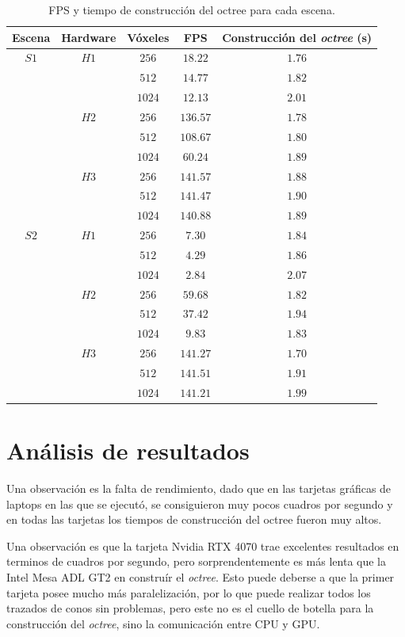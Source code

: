 \begin{table}[ht]
\centering
\begin{tabular}{|c|c|c|c|c|}
	\hline
	\textbf{Escena} & \textbf{Hardware} & \textbf{Vóxeles} & \textbf{FPS} & \textbf{Construcción del \textit{octree} (s)} \\
	\hline
	$S1$ & $H1$ & $256$ & $18.22$ & $1.76$ \\
	\cline{3-5}
	 & & $512$ & $14.77$ & $1.82$ \\
	\cline{3-5}
	 & & $1024$ & $12.13$ & $2.01$ \\
	\cline{2-5}
	 & $H2$ & $256$ & $136.57$ & $1.78$ \\
	\cline{3-5}
	 & & $512$ & $108.67$ & $1.80$ \\
	\cline{3-5}
	 & & $1024$ & $60.24$ & $1.89$ \\
	\cline{2-5}
	 & $H3$ & $256$ & $141.57$ & $1.88$ \\
	\cline{3-5}
	 & & $512$ & $141.47$ & $1.90$ \\
	\cline{3-5}
	 & & $1024$ & $140.88$ & $1.89$ \\
	\hline
	$S2$ & $H1$ & $256$ & $7.30$ & $1.84$ \\
	\cline{3-5}
	 & & $512$ & $4.29$ & $1.86$ \\
	\cline{3-5}
	 & & $1024$ & $2.84$ & $2.07$ \\
	\cline{2-5}
	 & $H2$ & $256$ & $59.68$ & $1.82$ \\
	\cline{3-5}
	 & & $512$ & $37.42$ & $1.94$ \\
	\cline{3-5}
	 & & $1024$ & $9.83$ & $1.83$ \\
	\cline{2-5}
	 & $H3$ & $256$ & $141.27$ & $1.70$ \\
	\cline{3-5}
	 & & $512$ & $141.51$ & $1.91$ \\
	\cline{3-5}
	 & & $1024$ & $141.21$ & $1.99$ \\
	\hline
\end{tabular}
\caption{FPS y tiempo de construcción del octree para cada escena.}
\label{tab:experiment-results}
\end{table}

\section{Análisis de resultados}

Una observación es la falta de rendimiento, dado que en las tarjetas gráficas de laptops en las que se ejecutó, se consiguieron muy pocos cuadros por segundo y en todas las tarjetas los tiempos de construcción del octree fueron muy altos.

Una observación es que la tarjeta Nvidia RTX 4070 trae excelentes resultados en terminos de cuadros por segundo, pero sorprendentemente es más lenta que la Intel Mesa ADL GT2 en construír el \textit{octree}.
Esto puede deberse a que la primer tarjeta posee mucho más paralelización, por lo que puede realizar todos los trazados de conos sin problemas, pero este no es el cuello de botella para la construcción del \textit{octree}, sino la comunicación entre CPU y GPU.
